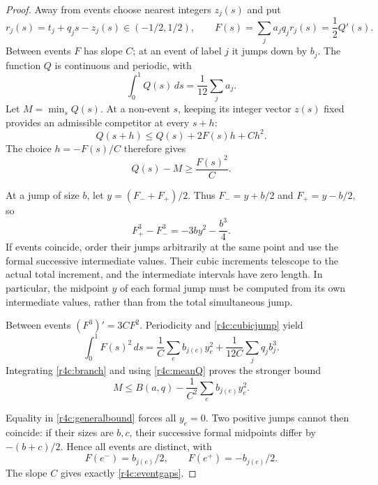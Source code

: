 \documentclass[11pt,a4paper]{article}
\theoremstyle{definition}\newtheorem{definition}[theorem]{Definition}
\theoremstyle{remark}\newtheorem{remark}[theorem]{Remark}
\numberwithin{equation}{section}
\begin{document}
\begin{proof}
Away from events choose nearest integers $z_j(s)$ and put
\[
 r_j(s)=t_j+q_js-z_j(s)\in(-1/2,1/2),
 \qquad F(s)=\sum_j a_jq_jr_j(s)=\frac12Q'(s).
\]
Between events $F$ has slope $C$; at an event of label $j$ it jumps
down by $b_j$.  The function $Q$ is continuous and periodic, with
\begin{equation}\label{r4c:meanQ}
 \int_0^1 Q(s)\,ds=\frac1{12}\sum_j a_j.
\end{equation}
Let $M=\min_sQ(s)$.  At a non-event $s$, keeping its integer vector
$z(s)$ fixed provides an admissible competitor at every $s+h$:
\[
 Q(s+h)\leq Q(s)+2F(s)h+Ch^2.
\]
The choice $h=-F(s)/C$ therefore gives
\begin{equation}\label{r4c:branch}
 Q(s)-M\geq\frac{F(s)^2}{C}.
\end{equation}

At a jump of size $b$, let $y=(F_-+F_+)/2$.  Thus
$F_-=y+b/2$ and $F_+=y-b/2$, so
\begin{equation}\label{r4c:cubicjump}
 F_+^3-F_-^3=-3by^2-\frac{b^3}{4}.
\end{equation}
If events coincide, order their jumps arbitrarily at the same point
and use the formal successive intermediate values.  Their cubic
increments telescope to the actual total increment, and the
intermediate intervals have zero length.  In particular, the midpoint
$y$ of each formal jump must be computed from its own intermediate
values, rather than from the total simultaneous jump.

Between events $(F^3)'=3CF^2$.  Periodicity and
\eqref{r4c:cubicjump} yield
\begin{equation}\label{r4c:cubicbalance}
 \int_0^1F(s)^2\,ds
   =\frac1C\sum_e b_{j(e)}y_e^2
     +\frac1{12C}\sum_j q_jb_j^3.
\end{equation}
Integrating \eqref{r4c:branch} and using \eqref{r4c:meanQ} proves
the stronger bound
\begin{equation}\label{r4c:strongbound}
 M\leq B(a,q)-\frac1{C^2}\sum_e b_{j(e)}y_e^2.
\end{equation}

Equality in \eqref{r4c:generalbound} forces all $y_e=0$.
Two positive jumps cannot then coincide: if their sizes are $b,c$,
their successive formal midpoints differ by $-(b+c)/2$.
Hence all events are distinct, with
\begin{equation}\label{r4c:centered}
 F(e^-)=b_{j(e)}/2,\qquad F(e^+)=-b_{j(e)}/2.
\end{equation}
The slope $C$ gives exactly \eqref{r4c:eventgaps}.


\end{proof}
\end{document}
